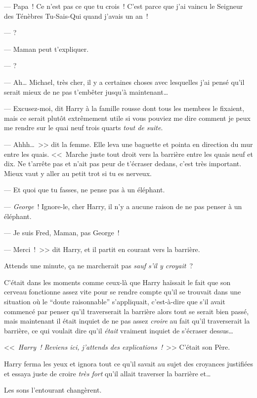 --- Papa~! Ce n'est pas ce que tu crois~! C'est parce que j'ai vaincu le Seigneur des Ténèbres Tu-Sais-Qui quand j'avais un an~!

---  ?

--- Maman peut t'expliquer.

---  ?

--- Ah… Michael, très cher, il y a certaines choses avec lesquelles j'ai pensé qu'il serait mieux de ne pas t'embêter jusqu'à maintenant…

--- Excusez-moi, dit Harry à la famille rousse dont tous les membres le fixaient, mais ce serait plutôt extrêmement utile si vous pouviez me dire comment je peux me rendre sur le quai neuf trois quarts \emph{tout de suite}.

--- Ahhh…~>> dit la femme. Elle leva une baguette et pointa en direction du mur entre les quais. <<~Marche juste tout droit vers la barrière entre les quais neuf et dix. Ne t'arrête pas et n'ait pas peur de t'écraser dedans, c'est très important. Mieux vaut y aller au petit trot si tu es nerveux.

--- Et quoi que tu fasses, ne pense pas à un éléphant.

--- \emph{George}~! Ignore-le, cher Harry, il n'y a aucune raison de ne pas penser à un éléphant.

--- Je suis Fred, Maman, pas George~!

--- Merci~!~>> dit Harry, et il partit en courant vers la barrière.

Attends une minute, ça ne marcherait pas \emph{sauf s'il y croyait}~?

C'était dans les moments comme ceux-là que Harry haïssait le fait que son cerveau fonctionne assez vite pour se rendre compte qu'il se trouvait dans une situation où le “doute raisonnable” s'appliquait, c'est-à-dire que s'il avait commencé par penser qu'il traverserait la barrière alors tout se serait bien passé, mais maintenant il était inquiet de ne pas assez \emph{croire} au fait qu'il traverserait la barrière, ce qui voulait dire qu'il \emph{était} vraiment inquiet de s'écraser dessus…

<<~\emph{Harry~! Reviens ici, j'attends des explications~!}~>> C'était son Père.

Harry ferma les yeux et ignora tout ce qu'il savait au sujet des croyances justifiées et essaya juste de croire \emph{très fort} qu'il allait traverser la barrière et…

Les sons l'entourant changèrent.

